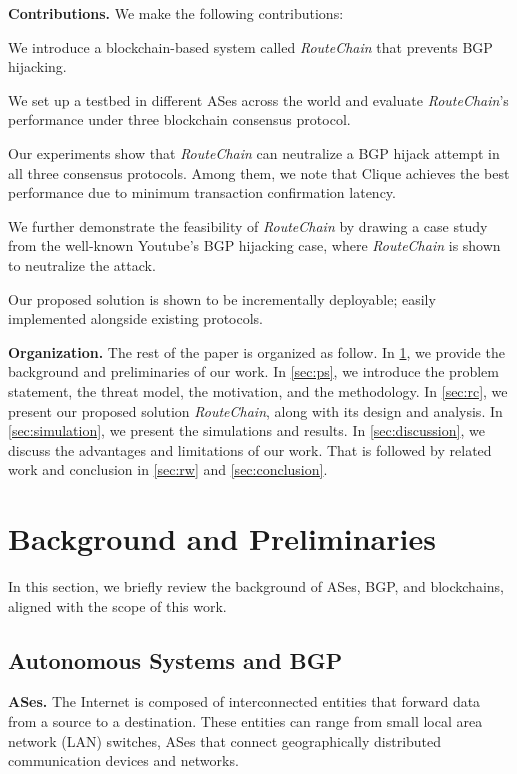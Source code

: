 \documentclass[5p]{elsarticle}
\newcommand{\BfPara}[1]{{\noindent\bf#1.}\xspace}
\newcommand{\rc}{{{\em RouteChain}}\xspace}
\begin{document}
\BfPara{Contributions} We make the following contributions:
\begin{enumerate*}
    \item We introduce a blockchain-based system called \rc that prevents BGP hijacking.
    \item We set up a testbed in different ASes across the world and evaluate \rc's performance under three blockchain consensus protocol. 
    \item Our experiments show that \rc can neutralize a BGP hijack attempt in all three consensus protocols. Among them, we note that Clique achieves the best performance due to minimum transaction confirmation latency. 
    \item We further demonstrate the feasibility of \rc by drawing a case study from the well-known Youtube's BGP hijacking case, where \rc is shown to neutralize the attack.  
    \item Our proposed solution is shown to be incrementally deployable; easily implemented alongside existing protocols. 
\end{enumerate*}

\BfPara{Organization} The rest of the paper is organized as follow. In \textsection\ref{sec:bg}, we provide the background and preliminaries of our work. In \textsection\ref{sec:ps}, we introduce the problem statement, the threat model, the motivation, and the methodology. In \textsection\ref{sec:rc}, we present our proposed solution \rc, along with its design and analysis. In \textsection\ref{sec:simulation}, we present the simulations and results. In \textsection\ref{sec:discussion}, we discuss the advantages and limitations of our work. That is followed by related work and conclusion in \textsection\ref{sec:rw} and \textsection\ref{sec:conclusion}.  




\section{Background and Preliminaries}\label{sec:bg}
In this section, we briefly review the background of ASes, BGP, and blockchains, aligned with the scope of this work. 

\subsection{Autonomous Systems and BGP} \label{sec:AS}
\BfPara{ASes} The Internet is composed of interconnected entities that forward data from a source to a destination. These entities can range from small local area network (LAN) switches, ASes that connect geographically distributed communication devices and networks. 
\end{document}
